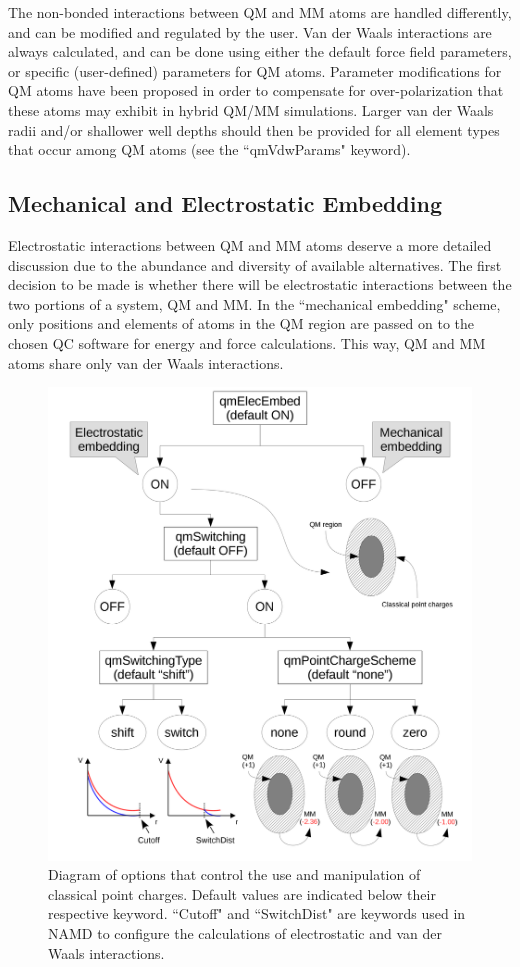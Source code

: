 The non-bonded interactions between QM and MM atoms are handled differently, 
and can be modified and regulated by the user. 
Van der Waals interactions are always calculated, and can be done 
using either the default force field parameters, or specific 
(user-defined) parameters for QM atoms. 
Parameter modifications for QM atoms have been proposed 
in order to compensate for over-polarization that these atoms 
may exhibit in hybrid QM/MM simulations. 
Larger van der Waals radii and/or shallower well depths 
should then be provided for all element types that occur 
among QM atoms (see the ``qmVdwParams" keyword).


\subsection{Mechanical and Electrostatic Embedding}

Electrostatic interactions between QM and MM atoms deserve 
a more detailed discussion due to the abundance and diversity 
of available alternatives. 
The first decision to be made is whether there will be electrostatic 
interactions between the two portions of a system, QM and MM. 
In the ``mechanical embedding" scheme, only positions and elements 
of atoms in the QM region are passed on to the chosen QC software 
for energy and force calculations. 
This way, QM and MM atoms share only van der  Waals interactions.

\begin{figure}[tbp]
\centering
\includegraphics[width=5in]{figures/OptionsDiagram.png}
\caption[Diagram of classical point charge options.]{%
Diagram of options that control the use and manipulation of 
classical point charges. Default values are indicated below their 
respective keyword. ``Cutoff" and ``SwitchDist" are keywords used in 
NAMD to configure the calculations of electrostatic and van der Waals 
interactions. 
}
\label{fig:qmmm_options}
\end{figure}

